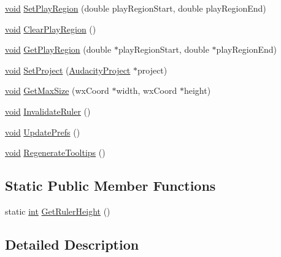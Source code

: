 \begin{DoxyCompactItemize}
\item 
\hyperlink{sound_8c_ae35f5844602719cf66324f4de2a658b3}{void} \hyperlink{class_adorned_ruler_panel_a23484024dcf9cd403c4736d0fc3710d0}{Set\+Play\+Region} (double play\+Region\+Start, double play\+Region\+End)
\item 
\hyperlink{sound_8c_ae35f5844602719cf66324f4de2a658b3}{void} \hyperlink{class_adorned_ruler_panel_a79ff1f96eebbb8d1da0ae612c1fc7df6}{Clear\+Play\+Region} ()
\item 
\hyperlink{sound_8c_ae35f5844602719cf66324f4de2a658b3}{void} \hyperlink{class_adorned_ruler_panel_a5c93ae6e22d1e935e72dcb73a1eb5291}{Get\+Play\+Region} (double $\ast$play\+Region\+Start, double $\ast$play\+Region\+End)
\item 
\hyperlink{sound_8c_ae35f5844602719cf66324f4de2a658b3}{void} \hyperlink{class_adorned_ruler_panel_ab9541e6ac87daa0db55adbc2e14c1ce9}{Set\+Project} (\hyperlink{class_audacity_project}{Audacity\+Project} $\ast$project)
\item 
\hyperlink{sound_8c_ae35f5844602719cf66324f4de2a658b3}{void} \hyperlink{class_adorned_ruler_panel_a51224053c24d432ed0425b05242505de}{Get\+Max\+Size} (wx\+Coord $\ast$width, wx\+Coord $\ast$height)
\item 
\hyperlink{sound_8c_ae35f5844602719cf66324f4de2a658b3}{void} \hyperlink{class_adorned_ruler_panel_a4f5f7d861706508cf2e6e6574d2e5e09}{Invalidate\+Ruler} ()
\item 
\hyperlink{sound_8c_ae35f5844602719cf66324f4de2a658b3}{void} \hyperlink{class_adorned_ruler_panel_a625ca5b03df68ddaaed92e6b13a60401}{Update\+Prefs} ()
\item 
\hyperlink{sound_8c_ae35f5844602719cf66324f4de2a658b3}{void} \hyperlink{class_adorned_ruler_panel_ab7dd558837ab69b70a500a74caae34c1}{Regenerate\+Tooltips} ()
\end{DoxyCompactItemize}
\subsection*{Static Public Member Functions}
\begin{DoxyCompactItemize}
\item 
static \hyperlink{xmltok_8h_a5a0d4a5641ce434f1d23533f2b2e6653}{int} \hyperlink{class_adorned_ruler_panel_a125b8ff3a6584fbcf4c352a1e1e5a351}{Get\+Ruler\+Height} ()
\end{DoxyCompactItemize}


\subsection{Detailed Description}


